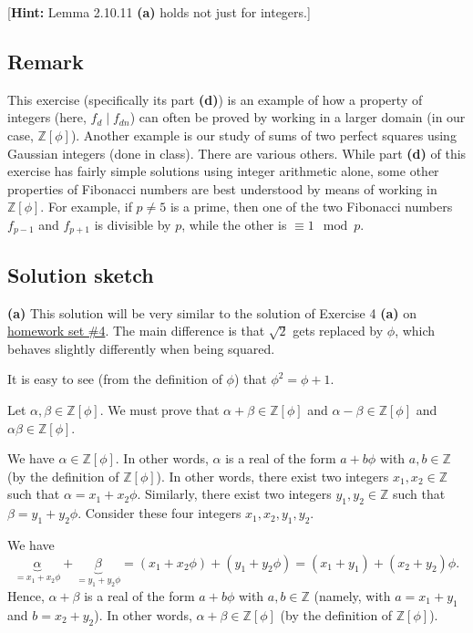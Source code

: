 \documentclass[paper=a4, fontsize=12pt]{scrartcl}%
\theoremstyle{plainsl}
\theoremstyle{definition}
\theoremstyle{remark}
\begin{document}
[\textbf{Hint:} Lemma 2.10.11 \textbf{(a)} holds not just for integers.]

\subsection{Remark}

This exercise (specifically its part \textbf{(d)}) is an example of how a
property of integers (here, $f_{d} \mid f_{dn}$) can often be proved by
working in a larger domain (in our case, $\mathbb{Z}\left[  \phi\right]  $).
Another example is our study of sums of two perfect squares using Gaussian
integers (done in class). There are various others. While part \textbf{(d)} of
this exercise has fairly simple solutions using integer arithmetic alone, some
other properties of Fibonacci numbers are best understood by means of working
in $\mathbb{Z}\left[  \phi\right]  $. For example, if $p \neq5$ is a prime,
then one of the two Fibonacci numbers $f_{p-1}$ and $f_{p+1}$ is divisible by
$p$, while the other is $\equiv1 \mod p$.

\subsection{Solution sketch}

\textbf{(a)} This solution will be very similar to the solution of Exercise 4
\textbf{(a)} on
\href{http://www.cip.ifi.lmu.de/~grinberg/t/19s/hw4s.pdf}{homework set \#4}.
The main difference is that $\sqrt{2}$ gets replaced by $\phi$, which behaves
slightly differently when being squared.

It is easy to see (from the definition of $\phi$) that $\phi^{2}=\phi+1$.

Let $\alpha,\beta\in\mathbb{Z}\left[  \phi\right]  $. We must prove that
$\alpha+\beta\in\mathbb{Z}\left[  \phi\right]  $ and $\alpha-\beta
\in\mathbb{Z}\left[  \phi\right]  $ and $\alpha\beta\in\mathbb{Z}\left[
\phi\right]  $.

We have $\alpha\in\mathbb{Z}\left[  \phi\right]  $. In other words, $\alpha$
is a real of the form $a+b\phi$ with $a,b\in\mathbb{Z}$ (by the definition of
$\mathbb{Z}\left[  \phi\right]  $). In other words, there exist two integers
$x_{1},x_{2}\in\mathbb{Z}$ such that $\alpha=x_{1}+x_{2}\phi$. Similarly,
there exist two integers $y_{1},y_{2}\in\mathbb{Z}$ such that $\beta
=y_{1}+y_{2}\phi$. Consider these four integers $x_{1},x_{2},y_{1},y_{2}$.

We have%
\[
\underbrace{\alpha}_{=x_{1}+x_{2}\phi}+\underbrace{\beta}_{=y_{1}+y_{2}\phi
}=\left(  x_{1}+x_{2}\phi\right)  +\left(  y_{1}+y_{2}\phi\right)  =\left(
x_{1}+y_{1}\right)  +\left(  x_{2}+y_{2}\right)  \phi.
\]
Hence, $\alpha+\beta$ is a real of the form $a+b\phi$ with $a,b\in\mathbb{Z}$
(namely, with $a=x_{1}+y_{1}$ and $b=x_{2}+y_{2}$). In other words,
$\alpha+\beta\in\mathbb{Z}\left[  \phi\right]  $ (by the definition of
$\mathbb{Z}\left[  \phi\right]  $).
\end{document}

